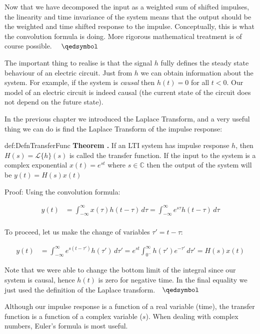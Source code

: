 \documentclass[14pt,a5paper,twoside]{book}
\newenvironment{myTheorem}[2]{ \begin{Theorem}[adjusted title=#1]{}{#2} 
  \textbf{Theorem \thetcbcounter.} \label{#2}}{\end{Theorem}}
\begin{document}
Now that we have decomposed the input as a weighted sum of shifted impulses, the linearity and time invariance of the system means that the output should be the weighted and time shifted response to the impulse. Conceptually, this is what the convolution formula is doing. More rigorous mathematical treatment is of course possible. $\quad\qedsymbol$

The important thing to realise is that the signal $h$ fully defines the steady state behaviour of an electric circuit. Just from $h$ we can obtain information about the system. For example, if the system is \emph{causal} then $h(t) = 0$ for all $t<0$. Our model of an electric circuit is indeed causal (the current state of the circuit does not depend on the future state).

In the previous chapter we introduced the Laplace Transform, and a very useful thing we can do is find the Laplace Transform of the impulse response:

\begin{myTheorem}{Transfer Function}{def:DefnTransferFunc}
If an LTI system has impulse response $h$, then $H(s) = \mathcal{L}\{h\}(s)$ is called the transfer function.
\bigbreak
If the input to the system is a complex exponential $x(t)=e^{st}$ where $s\in\mathbb{C}$ then the output of the system will be $y(t) = H(s)x(t)$
\end{myTheorem}
Proof: Using the convolution formula:

\begin{align*}
y(t) &= \int^{\infty}_{-\infty} x(\tau) h(t-\tau)\,d\tau = \int^{\infty}_{-\infty} e^{s\tau} h(t-\tau)\,d\tau \\
\end{align*}

To proceed, let us make the change of variables $\tau' = t - \tau$:

\begin{align*}
y(t) &= \int^{\infty}_{-\infty} e^{s(t-\tau')} h(\tau')\,d\tau' = e^{st} \int^{\infty}_{0^-} h(\tau') e^{-\tau'}\,d\tau' = H(s) x(t)
\end{align*}

Note that we were able to change the bottom limit of the integral since our system is causal, hence $h(t)$ is zero for negative time. In the final equality we just used the definition of the Laplace transform.$\quad\qedsymbol$

Although our impulse response is a function of a real variable (time), the transfer function is a function of a complex variable ($s$). When dealing with complex numbers, Euler's formula is most useful.
\end{document}
